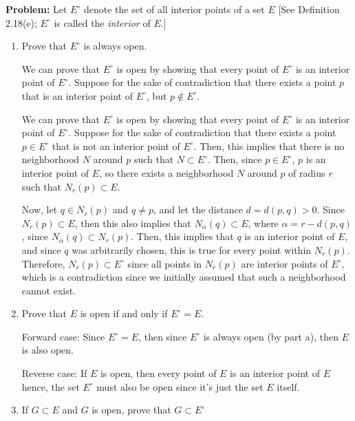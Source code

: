 \documentclass[10pt]{article}
\newenvironment{problem}{\textbf{Problem:}}{}
\begin{document}
	\begin{problem}
		Let \( E^{\circ} \) denote the set of all interior points of a set \( E \) [See Definition 
		2.18(e); \( E^{\circ} \) is called the \textit{interior} of \( E \).]
		\begin{enumerate}[label=\alph*)]
			\item Prove that \( E^{\circ} \) is always open. 

				\begin{solution}
					We can prove that \( E^{\circ} \) is open by showing that every point of \( E^{\circ} \) 
					is an interior point of \( E^{\circ} \). Suppose for the sake of contradiction that 
					there exists a point \( p \) that is an interior point of \( E^{\circ} \), but 
					\( p \not \in E^{\circ} \).  

					We can prove that \( E^{\circ} \) is open by showing that every point of \( E^{\circ} \) is an 
					interior point of \( E^{\circ} \). Suppose for the sake of contradiction that there exists 
					a point \( p \in E^{\circ}\) that is not an interior point of \( E^{\circ} \). Then, this 
					implies that there is no neighborhood \( N \) around \( p \) such that \( N \subset E^{\circ} \). 
					Then, since \( p \in E^{\circ} \), \( p \) is an interior point of \( E \), so there 
					exists a neighborhood \( N \) around \( p \) of radius \( r \) such that \( N_r(p) \subset E \). 

					Now, let \( q \in N_r(p) \) and \( q \neq p \), and let the distance \( d = d(p, q) > 0\). Since 
					\( N_r(p) \subset E \), then this also implies that \( N_\alpha(q) \subset E \), 
					where \( \alpha = r - d(p, q) \), since \( N_\alpha(q) \subset N_r(p) \). Then, this 
					implies that \( q  \) is an interior point of \( E \), and since \( q \) was 
					arbitrarily chosen, this is true for every point within \( N_r(p) \). Therefore, 
					\( N_r(p) \subset E^{\circ} \) since all points 
					in \( N_r(p) \) are interior points of \( E^{\circ} \), which is a contradiction since we initially 
					assumed that such a neighborhood cannot exist. 
				\end{solution}
			\item Prove that \( E \) is open if and only if \( E^{\circ} = E \). 

				\begin{solution}
					Forward case: Since \( E^{\circ} = E \), then since \( E^{\circ} \) is always open (by part a), then
					\( E \) is also open. 

					Reverse case: If \( E \) is open, then every point of \( E \) is an interior point of \( E \) 
					hence, the set \( E^{\circ} \) must also be open since it's just the set \( E \) itself.  
				\end{solution}
			\item If \( G \subset E \) and \( G \) is open, prove that \( G\subset E^{\circ} \) 


\end{enumerate}
\end{problem}
\end{document}
